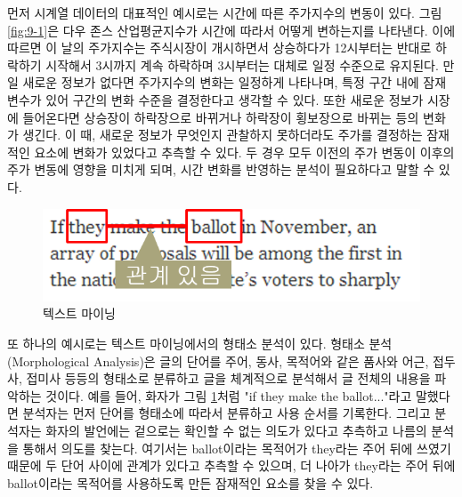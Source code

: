 \documentclass[a4paper]{oblivoir}
\begin{document}
먼저 시계열 데이터의 대표적인 예시로는 시간에 따른 주가지수의 변동이 있다. 그림 \ref{fig:9-1}은 다우 존스 산업평균지수가 시간에 따라서 어떻게 변하는지를 나타낸다. 이에 따르면 이 날의 주가지수는 주식시장이 개시하면서 상승하다가 12시부터는 반대로 하락하기 시작해서 3시까지 계속 하락하며 3시부터는 대체로 일정 수준으로 유지된다. 만일 새로운 정보가 없다면 주가지수의 변화는 일정하게 나타나며, 특정 구간 내에 잠재 변수가 있어 구간의 변화 수준을 결정한다고 생각할 수 있다. 또한 새로운 정보가 시장에 들어온다면 상승장이 하락장으로 바뀌거나 하락장이 횡보장으로 바뀌는 등의 변화가 생긴다. 이 때, 새로운 정보가 무엇인지 관찰하지 못하더라도 주가를 결정하는 잠재적인 요소에 변화가 있었다고 추측할 수 있다. 두 경우 모두 이전의 주가 변동이 이후의 주가 변동에 영향을 미치게 되며, 시간 변화를 반영하는 분석이 필요하다고 말할 수 있다. \\

\begin{figure}[ht] \centering 
\includegraphics[scale=0.8]{fig9_2.png} 
\caption{텍스트 마이닝}
\label{fig:9-2}
\end{figure}

또 하나의 예시로는 텍스트 마이닝에서의 형태소 분석이 있다. 형태소 분석(Morphological Analysis)은 글의 단어를 주어, 동사, 목적어와 같은 품사와 어근, 접두사, 접미사 등등의 형태소로 분류하고 글을 체계적으로 분석해서 글 전체의 내용을 파악하는 것이다. 예를 들어, 화자가 그림 \ref{fig:9-2}처럼 "if they make the ballot..."라고 말했다면 분석자는 먼저 단어를 형태소에 따라서 분류하고 사용 순서를 기록한다. 그리고  분석자는 화자의 발언에는 겉으로는 확인할 수 없는 의도가 있다고 추측하고 나름의 분석을 통해서 의도를 찾는다. 여기서는 ballot이라는 목적어가 they라는 주어 뒤에 쓰였기 때문에 두 단어 사이에 관계가 있다고 추측할 수 있으며, 더 나아가 they라는 주어 뒤에 ballot이라는 목적어를 사용하도록 만든 잠재적인 요소를 찾을 수 있다.  \\
\end{document}
